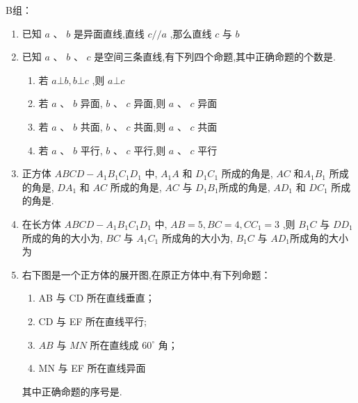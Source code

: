 B组：
\begin{enumerate}
    \item 已知 $ a $ 、 $ b $ 是异面直线,直线 $ c//a $ ,那么直线 $ c $ 与 $ b $ 

    \item 已知 $ {a} $ 、 $ {b} $ 、 $ {c} $ 是空间三条直线,有下列四个命题,其中正确命题的个数是.
    \begin{enumerate}
        \item 若 $ a\bot b,b\bot c $ ,则 $ a\bot c $
        \item 若 $ a $ 、 $ b $ 异面, $ b $ 、 $ c $ 异面,则 $ a $ 、 $ c $ 异面
        \item 若 $ a $ 、 $ b $ 共面, $ b $ 、 $ c $ 共面,则 $ a $ 、 $ c $ 共面
        \item 若 $ a $ 、 $ b $ 平行, $ b $ 、 $ c $ 平行,则 $ a $ 、 $ c $ 平行
    \end{enumerate}

    \item 正方体 $ {{ABCD}} - {{A}}_{1}{{B}}_{1}{{C}}_{1}{{D}}_{1} $ 中, $ {{A}}_{1}{A} $ 和 $ {{D}}_{1}{{C}}_{1} $ 所成的角是, $ {{AC}} $ 和$ {{A}}_{1}{{B}}_{1} $ 所成的角是, $ {{{DA}}}_{1} $ 和 $ {{AC}} $ 所成的角是, $ {{AC}} $ 与 $ {{D}}_{1}{{B}}_{1} $所成的角是, $ {{{AD}}}_{1} $ 和 $ {{{DC}}}_{1} $ 所成的角是.
    
    \item 在长方体 $ {ABCD} - {A}_{1}{B}_{1}{C}_{1}{D}_{1} $ 中, $ {AB} = 5,{BC} = 4,{C{C}_{1}} = 3 $ ,则 $ {B}_{1}C $ 与 $ D{D}_{1} $ 所成的角的大小为, $ {BC} $ 与 $ {A}_{1}{C}_{1} $ 所成角的大小为, $ {B}_{1}C $ 与 $ A{D}_{1} $所成角的大小为

    \item 右下图是一个正方体的展开图,在原正方体中,有下列命题：
    \begin{enumerate}
        \item AB 与 CD 所在直线垂直；
        \item CD 与 EF 所在直线平行;
        \item $ {{AB}} $ 与 $ {{MN}} $ 所在直线成 $ {60}^{ \circ  } $ 角；
        \item MN 与 EF 所在直线异面
    \end{enumerate}
    其中正确命题的序号是.
    \begin{center}


\end{center}
\end{enumerate}
